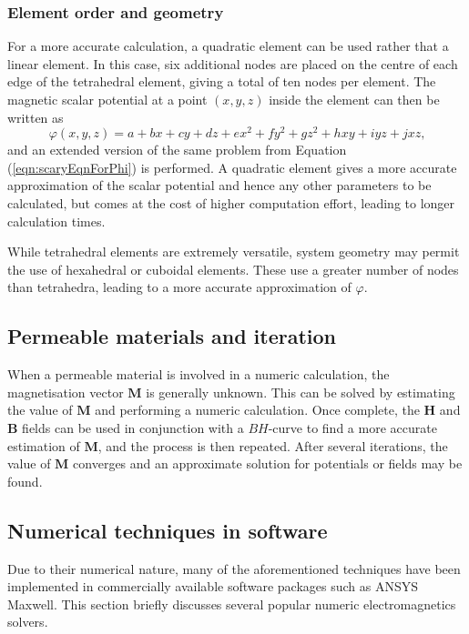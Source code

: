\subsubsection{Element order and geometry}
For a more accurate calculation, a quadratic element can be used rather that a linear element. In this case, six additional nodes are placed on the centre of each edge of the tetrahedral element, giving a total of ten nodes per element. The magnetic scalar potential at a point \(\left(x,y,z\right)\) inside the element can then be written as
\begin{equation}
    \varphi\left(x,y,z\right) = a + bx + cy + dz + ex^2 + fy^2 + gz^2 + hxy + iyz + jxz \text{,}
\end{equation}
and an extended version of the same problem from Equation (\ref{eqn:scaryEqnForPhi}) is performed. A quadratic element gives a more accurate approximation of the scalar potential and hence any other parameters to be calculated, but comes at the cost of higher computation effort, leading to longer calculation times.


While tetrahedral elements are extremely versatile, system geometry may permit the use of hexahedral or cuboidal elements. These use a greater number of nodes than tetrahedra, leading to a more accurate approximation of \(\varphi\).


\subsection{Permeable materials and iteration}
When a permeable material is involved in a numeric calculation, the magnetisation vector \(\mathbf{M}\) is generally unknown. This can be solved by estimating the value of \(\mathbf{M}\) and performing a numeric calculation. Once complete, the \(\mathbf{H}\) and \(\mathbf{B}\) fields can be used in conjunction with a \(BH\)-curve to find a more accurate estimation of \(\mathbf{M}\), and the process is then repeated. After several iterations, the value of \(\mathbf{M}\) converges and an approximate solution for potentials or fields may be found.

\subsection{Numerical techniques in software}
Due to their numerical nature, many of the aforementioned techniques have been implemented in commercially available software packages such as ANSYS Maxwell. This section briefly discusses several popular numeric electromagnetics solvers.

